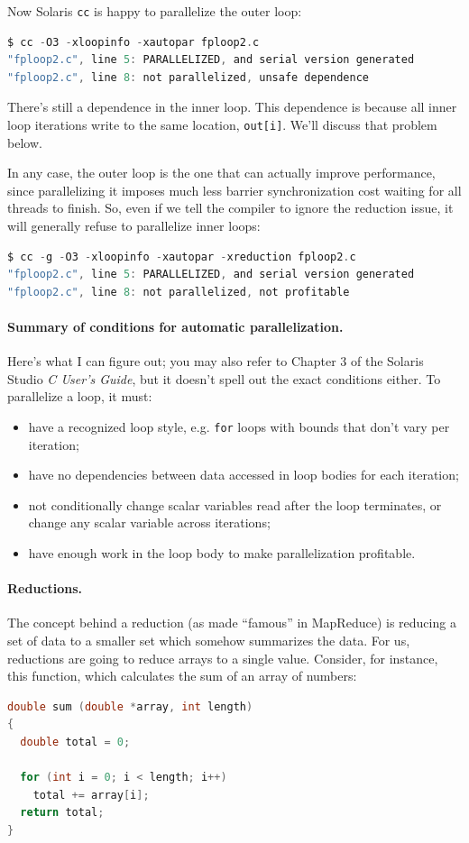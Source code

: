 \documentclass[a4paper]{report}
\begin{document}
Now Solaris {\tt cc} is happy to parallelize the outer loop:
{\small 
\begin{lstlisting}[language=C]
$ cc -O3 -xloopinfo -xautopar fploop2.c 
"fploop2.c", line 5: PARALLELIZED, and serial version generated
"fploop2.c", line 8: not parallelized, unsafe dependence
\end{lstlisting} 
}

There's still a dependence in the inner loop. This dependence is because
all inner loop iterations write to the same location, {\tt out[i]}. We'll
discuss that problem below.

In any case, the outer loop is the one that can actually improve performance,
since parallelizing it imposes much less barrier synchronization cost 
waiting for all threads to finish. So, even if we tell the compiler to ignore
the reduction issue, it will generally refuse to parallelize inner loops:
{\small 
\begin{lstlisting}[language=C]
$ cc -g -O3 -xloopinfo -xautopar -xreduction fploop2.c 
"fploop2.c", line 5: PARALLELIZED, and serial version generated
"fploop2.c", line 8: not parallelized, not profitable
\end{lstlisting} 
}


\paragraph{Summary of conditions for automatic parallelization.} Here's what I 
can figure out; you may also refer to Chapter 3 of the Solaris Studio
\emph{C User's Guide}, but it doesn't spell out the exact conditions
either. To parallelize a loop, it must:
\begin{itemize}
\item have a recognized loop style, e.g. {\tt for} loops with
bounds that don't vary per iteration;
\item have no dependencies between data accessed in loop bodies for
  each iteration;
\item not conditionally change scalar variables read after the loop
  terminates, or change any scalar variable across iterations;
\item have enough work in the loop body to make parallelization profitable.
\end{itemize}

\paragraph{Reductions.} The concept behind a 
reduction (as made ``famous'' in MapReduce) is reducing a set of data to a smaller set which somehow
summarizes the data. For us, reductions are going to reduce
arrays to a single value. Consider, for instance, this function, which
calculates the sum of an array of numbers:
{
\begin{lstlisting}[language=C]
double sum (double *array, int length)
{
  double total = 0;

  for (int i = 0; i < length; i++)
    total += array[i];
  return total;
}
\end{lstlisting}
}
\end{document}
